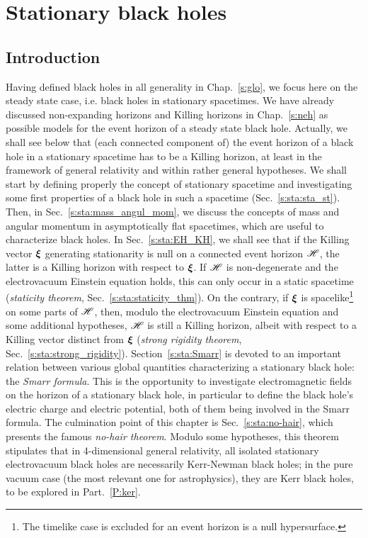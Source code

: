 \chapter{Stationary black holes}
\label{s:sta}

\minitoc

\section{Introduction}

Having defined black holes in all generality in Chap.~\ref{s:glo}, we focus
here on the steady state case, i.e. black holes in stationary spacetimes.
We have already discussed
non-expanding horizons and Killing horizons in Chap.~\ref{s:neh} as
possible models for the event horizon of a
steady state black hole. Actually, we shall see below that (each connected
component of) the event horizon of a black hole in a stationary spacetime has to be
a Killing horizon, at least in the framework of general relativity and within
rather general hypotheses.
We shall start by defining properly the concept of stationary
spacetime and investigating some first properties of a black hole
in such a spacetime (Sec.~\ref{s:sta:sta_st}).
Then, in Sec.~\ref{s:sta:mass_angul_mom}, we discuss the concepts
of mass and angular momentum in asymptotically flat spacetimes, which are useful to characterize black holes. In Sec.~\ref{s:sta:EH_KH}, we shall
see that
if the Killing vector $\bm{\xi}$ generating stationarity is null on
a connected event horizon $\mathscr{H}$, the latter is a Killing horizon with
respect to $\bm{\xi}$.  If $\mathscr{H}$ is non-degenerate and the
electrovacuum Einstein equation holds, this can only occur in a static spacetime
(\emph{staticity theorem}, Sec.~\ref{s:sta:staticity_thm}).
On the contrary, if $\bm{\xi}$ is spacelike\footnote{The timelike
case is excluded for an event horizon is a null hypersurface.} on some parts of $\mathscr{H}$, then, modulo the
electrovacuum Einstein equation and some additional hypotheses,
$\mathscr{H}$ is still a Killing horizon, albeit with respect to a Killing vector
distinct from $\bm{\xi}$ (\emph{strong rigidity theorem}, Sec.~\ref{s:sta:strong_rigidity}).
Section~\ref{s:sta:Smarr} is devoted to an important relation between various global
quantities characterizing a stationary black hole: the \emph{Smarr formula}.
This is the opportunity to investigate electromagnetic
fields on the horizon of a stationary black hole, in particular to define
the black hole's electric charge and electric potential, both of them being involved
in the Smarr formula. The culmination point of this chapter is
Sec.~\ref{s:sta:no-hair}, which presents the famous
\emph{no-hair theorem}. Modulo some hypotheses, this theorem stipulates that in 4-dimensional
general relativity, all isolated stationary electrovacuum black holes are necessarily
Kerr-Newman black holes; in the pure vacuum case (the most relevant one for astrophysics),
they are Kerr black holes, to be explored in Part.~\ref{P:ker}.

